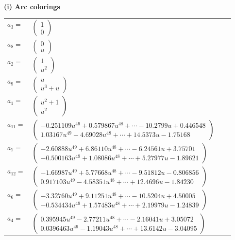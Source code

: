\documentclass[1p]{elsarticle_modified}
\theoremstyle{definition}
\begin{document}
\flushleft \textbf{(i) Arc colorings}\\
\begin{tabular}{m{7pt} m{180pt} m{7pt} m{180pt} }
\flushright $a_{3}=$&$\begin{pmatrix}1\\0\end{pmatrix}$ \\
\flushright $a_{8}=$&$\begin{pmatrix}0\\u\end{pmatrix}$ \\
\flushright $a_{2}=$&$\begin{pmatrix}1\\u^2\end{pmatrix}$ \\
\flushright $a_{9}=$&$\begin{pmatrix}u\\u^3+u\end{pmatrix}$ \\
\flushright $a_{1}=$&$\begin{pmatrix}u^2+1\\u^2\end{pmatrix}$ \\
\flushright $a_{11}=$&$\begin{pmatrix}-0.251109 u^{49}+0.579867 u^{48}+\cdots-10.2799 u+0.446548\\1.03167 u^{49}-4.69028 u^{48}+\cdots+14.5373 u-1.75168\end{pmatrix}$ \\
\flushright $a_{7}=$&$\begin{pmatrix}-2.60888 u^{49}+6.86110 u^{48}+\cdots-6.24561 u+3.75701\\-0.500163 u^{49}+1.08086 u^{48}+\cdots+5.27977 u-1.89621\end{pmatrix}$ \\
\flushright $a_{12}=$&$\begin{pmatrix}-1.66987 u^{49}+5.77668 u^{48}+\cdots-9.51812 u-0.806856\\0.917103 u^{49}-4.58351 u^{48}+\cdots+12.4696 u-1.84230\end{pmatrix}$ \\
\flushright $a_{6}=$&$\begin{pmatrix}-3.32760 u^{49}+9.11251 u^{48}+\cdots-10.5204 u+4.50005\\-0.534434 u^{49}+1.57483 u^{48}+\cdots+2.19979 u-1.24839\end{pmatrix}$ \\
\flushright $a_{4}=$&$\begin{pmatrix}0.395945 u^{49}-2.77211 u^{48}+\cdots-2.16041 u+3.05072\\0.0396463 u^{49}-1.19043 u^{48}+\cdots+13.6142 u-3.04095\end{pmatrix}$ \\

\end{tabular}
\end{document}
